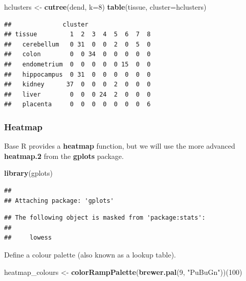 \documentclass[]{book}
\newenvironment{Shaded}{\begin{snugshade}}{\end{snugshade}}
\newcommand{\KeywordTok}[1]{\textcolor[rgb]{0.13,0.29,0.53}{\textbf{{#1}}}}
\newcommand{\DataTypeTok}[1]{\textcolor[rgb]{0.13,0.29,0.53}{{#1}}}
\newcommand{\DecValTok}[1]{\textcolor[rgb]{0.00,0.00,0.81}{{#1}}}
\newcommand{\StringTok}[1]{\textcolor[rgb]{0.31,0.60,0.02}{{#1}}}
\newcommand{\NormalTok}[1]{{#1}}
\theoremstyle{definition}
\theoremstyle{definition}
\theoremstyle{definition}
\theoremstyle{remark}
\begin{document}
\begin{Shaded}
\begin{Highlighting}[]
\NormalTok{hclusters <-}\StringTok{ }\KeywordTok{cutree}\NormalTok{(dend, }\DataTypeTok{k=}\DecValTok{8}\NormalTok{)}
\KeywordTok{table}\NormalTok{(tissue, }\DataTypeTok{cluster=}\NormalTok{hclusters)}
\end{Highlighting}
\end{Shaded}

\begin{verbatim}
##              cluster
## tissue         1  2  3  4  5  6  7  8
##   cerebellum   0 31  0  0  2  0  5  0
##   colon        0  0 34  0  0  0  0  0
##   endometrium  0  0  0  0  0 15  0  0
##   hippocampus  0 31  0  0  0  0  0  0
##   kidney      37  0  0  0  2  0  0  0
##   liver        0  0  0 24  2  0  0  0
##   placenta     0  0  0  0  0  0  0  6
\end{verbatim}

\subsubsection{Heatmap}\label{heatmap}

Base R provides a \textbf{heatmap} function, but we will use the more
advanced \textbf{heatmap.2} from the \textbf{gplots} package.

\begin{Shaded}
\begin{Highlighting}[]
\KeywordTok{library}\NormalTok{(gplots)}
\end{Highlighting}
\end{Shaded}

\begin{verbatim}
## 
## Attaching package: 'gplots'
\end{verbatim}

\begin{verbatim}
## The following object is masked from 'package:stats':
## 
##     lowess
\end{verbatim}

Define a colour palette (also known as a lookup table).

\begin{Shaded}
\begin{Highlighting}[]
\NormalTok{heatmap_colours <-}\StringTok{ }\KeywordTok{colorRampPalette}\NormalTok{(}\KeywordTok{brewer.pal}\NormalTok{(}\DecValTok{9}\NormalTok{, }\StringTok{"PuBuGn"}\NormalTok{))(}\DecValTok{100}\NormalTok{)}
\end{Highlighting}
\end{Shaded}
\end{document}
